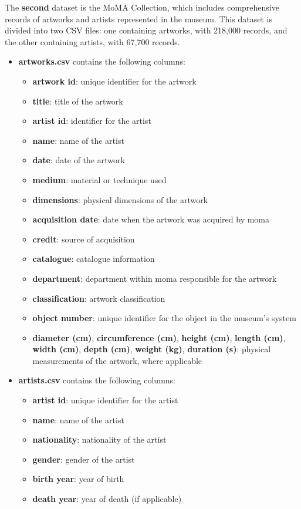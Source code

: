 \documentclass[a4paper,12pt]{article}
\begin{document}
The \textbf{second} dataset is the MoMA Collection, which includes comprehensive records of artworks and artists represented in the museum. This dataset is divided into two CSV files: one containing artworks, with 218,000 records, and the other containing artists, with 67,700 records.
\begin{itemize}
    \item \textbf{artworks.csv} contains the following columns:
          \begin{itemize}
              \item \textbf{artwork id}: unique identifier for the artwork
              \item \textbf{title}: title of the artwork
              \item \textbf{artist id}: identifier for the artist
              \item \textbf{name}: name of the artist
              \item \textbf{date}: date of the artwork
              \item \textbf{medium}: material or technique used
              \item \textbf{dimensions}: physical dimensions of the artwork
              \item \textbf{acquisition date}: date when the artwork was acquired by moma
              \item \textbf{credit}: source of acquisition
              \item \textbf{catalogue}: catalogue information
              \item \textbf{department}: department within moma responsible for the artwork
              \item \textbf{classification}: artwork classification
              \item \textbf{object number}: unique identifier for the object in the museum’s system
              \item \textbf{diameter (cm)}, \textbf{circumference (cm)}, \textbf{height (cm)}, \textbf{length (cm)}, \textbf{width (cm)}, \textbf{depth (cm)}, \textbf{weight (kg)}, \textbf{duration (s)}: physical measurements of the artwork, where applicable

          \end{itemize}

    \item \textbf{artists.csv} contains the following columns:
          \begin{itemize}
              \item \textbf{artist id}: unique identifier for the artist
              \item \textbf{name}: name of the artist
              \item \textbf{nationality}: nationality of the artist
              \item \textbf{gender}: gender of the artist
              \item \textbf{birth year}: year of birth
              \item \textbf{death year}: year of death (if applicable)
          \end{itemize}
\end{itemize}
\end{document}
